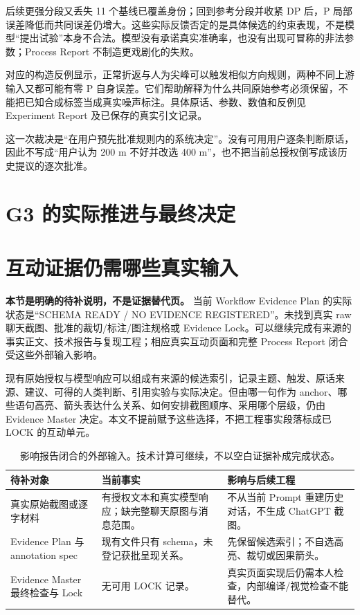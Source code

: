 \documentclass[11pt,a4paper]{article}
\begin{document}
后续更强分段又丢失 11 个基线已覆盖身份；回到参考分段并收紧 DP 后，P 局部误差降低而共同误差仍增大。这些实际反馈否定的是具体候选的约束表现，不是模型“提出试验”本身不合法。模型没有承诺真实准确率，也没有出现可冒称的非法参数；Process Report 不制造更戏剧化的失败。

对应的构造反例显示，正常折返与人为尖峰可以触发相似方向规则，两种不同上游输入又都可能有零 P 自身误差。它们帮助解释为什么共同原始参考必须保留，不能把已知合成标签当成真实噪声标注。具体原话、参数、数值和反例见 Experiment Report 及已保存的真实引文记录。

这一次裁决是“在用户预先批准规则内的系统决定”。没有可用用户逐条判断原话，因此不写成“用户认为 200 m 不好并改选 400 m”，也不把当前总授权倒写成该历史提议的逐次批准。

\section{G3 的实际推进与最终决定}


\section{互动证据仍需哪些真实输入}
\begin{contextbox}
\textbf{本节是明确的待补说明，不是证据替代页。} 当前 Workflow Evidence Plan 的实际状态是“SCHEMA READY / NO EVIDENCE REGISTERED”。未找到真实 raw 聊天截图、批准的裁切/标注/图注规格或 Evidence Lock。可以继续完成有来源的事实正文、技术报告与复现工程；相应真实互动页面和完整 Process Report 闭合受这些外部输入影响。
\end{contextbox}

现有原始授权与模型响应可以组成有来源的候选索引，记录主题、触发、原话来源、建议、可得的人类判断、引用实验与实际决定。但由哪一句作为 anchor、哪些语句高亮、箭头表达什么关系、如何安排截图顺序、采用哪个层级，仍由 Evidence Master 决定。本文不提前赋予这些选择，不把工程事实段落标成已 LOCK 的互动单元。

\begin{table}[H]\centering\small\caption{影响报告闭合的外部输入。技术计算可继续，不以空白证据补成完成状态。}\begin{tabularx}{\linewidth}{@{}p{31mm}Y Y@{}}\toprule 待补对象 & 当前事实 & 影响与后续工程 \\ \midrule
真实原始截图或逐字材料 & 有授权文本和真实模型响应；缺完整聊天原图与消息范围。 & 不从当前 Prompt 重建历史对话，不生成 ChatGPT 截图。 \\
Evidence Plan 与 annotation spec & 现有文件只有 schema，未登记获批呈现关系。 & 先保留候选索引；不自选高亮、裁切或因果箭头。 \\
Evidence Master 最终检查与 Lock & 无可用 LOCK 记录。 & 真实页面实现后仍需本人检查，内部编译/视觉检查不能替代。 \\
\bottomrule\end{tabularx}\end{table}
\end{document}
